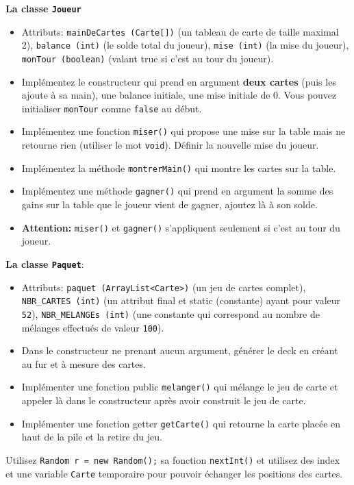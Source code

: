 \begin{Exercice}[15 minutes]
\textbf{La classe \lstinline{Joueur}}
\begin{itemize}
    \item Attributs: \lstinline{mainDeCartes (Carte[])} (un tableau de carte de taille maximal 2), \lstinline{balance (int)} (le solde total du joueur), \lstinline{mise (int)} (la mise du joueur), \lstinline{monTour (boolean)} (valant true si c’est au tour du joueur).
    \item Implémentez le constructeur qui prend en argument \textbf{deux cartes} (puis les ajoute à sa main), une balance initiale, une mise initiale de 0. Vous pouvez initialiser \lstinline{monTour} comme \lstinline{false} au début.
    \item Implémentez une fonction \lstinline{miser()} qui propose une mise sur la table mais ne retourne rien (utiliser le mot \lstinline{void}). Définir la nouvelle mise du joueur.
    \item Implémentez la méthode \lstinline{montrerMain()} qui montre les cartes sur la table.
    \item Implémentez une méthode \lstinline{gagner()} qui prend en argument la somme des gains sur la table que le joueur vient de gagner, ajoutez là à son solde.
    \item \textbf{Attention:} \lstinline{miser()} et \lstinline{gagner()} s'appliquent seulement si c’est au tour du joueur.
\end{itemize}


\textbf{La classe \lstinline{Paquet}}:
\begin{itemize}
    \item Attributs: \lstinline{paquet (ArrayList<Carte>)} (un jeu de cartes complet), \lstinline{NBR_CARTES (int)} (un attribut final et static (constante) ayant pour valeur \lstinline{52}), \lstinline{NBR_MELANGEs (int)} (une constante qui correspond au nombre de mélanges effectués de valeur \lstinline{100}).
    \item Dans le constructeur ne prenant aucun argument, générer le deck en créant au fur et à mesure des cartes. 
    \item Implémenter une fonction public \lstinline{melanger()} qui mélange le jeu de carte et appeler là dans le constructeur après avoir construit le jeu de carte.
    \item Implémenter une fonction getter \lstinline{getCarte()} qui retourne la carte placée en haut de la pile et la retire du jeu.
\end{itemize}
\begin{conseil}
Utilisez \lstinline{Random r = new Random();} sa fonction \lstinline{nextInt()} et utilisez des index et une variable \lstinline{Carte} temporaire pour pouvoir échanger les positions des cartes.
\end{conseil}


\end{Exercice}
